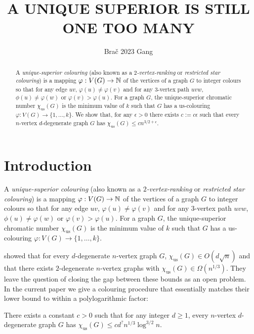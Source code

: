 \documentclass{patmorin}
\title{\MakeUppercase{A Unique Superior is Still One Too Many}}
\author{Bra\v{c} 2023 Gang}
\newcommand{\defin}[1]{\emph{\color{brightmaroon}#1}}
\newcommand{\trn}{\chi_{\mathrm{us}}}
\begin{document}
\maketitle

\begin{abstract}
  A \defin{unique-superior colouring} (also known as a \defin{$2$-vertex-ranking} or \defin{restricted star colouring}) is a mapping $\varphi:V(G)\to\mathbb{N}$ of the vertices of a graph $G$ to integer colours so that for any edge $uv$, $\varphi(u)\neq \varphi(v)$ and for any $3$-vertex path $uvw$, $\phi(u)\neq\varphi(w)$ or $\varphi(v)>\varphi(u)$.  For a graph $G$, the unique-superior chromatic number $\trn(G)$ is the minimum value of $k$ such that $G$ has a us-colouring $\varphi:V(G)\to\{1,\ldots,k\}$.  We show that, for any $\epsilon >0$ there exists $c:=c\epsilon$ such that every $n$-vertex $d$-degenerate graph $G$ has $\trn(G) \le c n^{3/2+\epsilon}$.
\end{abstract}


%



\section{Introduction}

A \defin{unique-superior colouring} (also known as a \defin{$2$-vertex-ranking} or \defin{restricted star colouring}) is a mapping $\varphi:V(G)\to\mathbb{N}$ of the vertices of a graph $G$ to integer colours so that for any edge $uv$, $\varphi(u)\neq \varphi(v)$ and for any $3$-vertex path $uvw$, $\phi(u)\neq\varphi(w)$ or $\varphi(v)>\varphi(u)$.  For a graph $G$, the unique-superior chromatic number $\trn(G)$ is the minimum value of $k$ such that $G$ has a us-colouring $\varphi:V(G)\to\{1,\ldots,k\}$.

\citet{karpas.neiman.ea:on} showed that for every $d$-degenerate $n$-vertex graph $G$, $\trn(G)\in O(d\sqrt{n})$ and that there exists $2$-degenerate $n$-vertex graphs with $\trn(G)\in\Omega(n^{1/3})$.  They leave the question of closing the gap between these bounds as an open problem. In the current paper we give a colouring procedure that essentially matches their lower bound to within a polylogarithmic factor:

\begin{thm}\label{d_degenerate_upper_bound}
  There exists a constant $c>0$ such that for any integer $d\ge 1$, every $n$-vertex $d$-degenerate graph $G$ has $\trn(G) \le c d^? n^{1/3}\log^{3/2} n$.
\end{thm}
\end{document}
